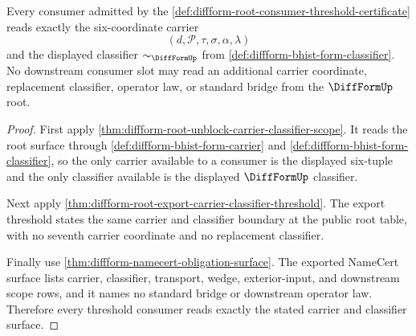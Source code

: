 \begin{theorem}
\label{thm:diffform-root-consumer-carrier-readback}
Every consumer admitted by the
\autoref{def:diffform-root-consumer-threshold-certificate} reads exactly the
six-coordinate carrier
$$
(d,\mathcal{P},\tau,\sigma,\alpha,\lambda)
$$
and the displayed classifier $\sim_{\DiffFormUp}$ from
\autoref{def:diffform-bhist-form-classifier}. No downstream consumer slot may
read an additional carrier coordinate, replacement classifier, operator law,
or standard bridge from the $\DiffFormUp$ root.
\end{theorem}
\begin{proof}
First apply
\autoref{thm:diffform-root-unblock-carrier-classifier-scope}. It reads the
root surface through \autoref{def:diffform-bhist-form-carrier} and
\autoref{def:diffform-bhist-form-classifier}, so the only carrier available
to a consumer is the displayed six-tuple and the only classifier available is
the displayed $\DiffFormUp$ classifier.

Next apply \autoref{thm:diffform-root-export-carrier-classifier-threshold}.
The export threshold states the same carrier and classifier boundary at the
public root table, with no seventh carrier coordinate and no replacement
classifier.

Finally use \autoref{thm:diffform-namecert-obligation-surface}. The exported
NameCert surface lists carrier, classifier, transport, wedge, exterior-input,
and downstream scope rows, and it names no standard bridge or downstream
operator law. Therefore every threshold consumer reads exactly the stated
carrier and classifier surface.
\end{proof}

